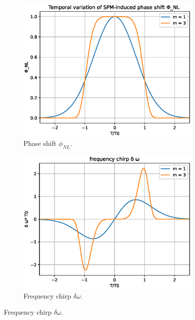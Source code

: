         
        
        \begin{figure}[label={fig:spmsg}, caption={Effect of SPM in a Gaussian pulse. Following equations \eqref{eq_phi} - \eqref{eq_spmchirpsg}. }]
        \begin{subfigure}[b]{.53\textwidth}
		    \centering	
            \includegraphics[width=1\textwidth]{figures/chap3/shift.eps}
            \caption{Phase shift $\phi_{NL}$.}
            \label{fig:shift_s}
        \end{subfigure}
        \hfill
        \begin{subfigure}[b]{.53\textwidth}
		    \centering	
            \includegraphics[width=1\textwidth]{figures/chap3/chirp.eps}
            \caption{Frequency chirp $\delta \omega$.}
            \label{fig:chirp_s}
        \end{subfigure}
        \end{figure}
        
